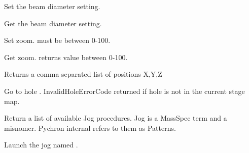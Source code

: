\documentclass[letterpaper,10pt,english]{sphinxmanual}
\begin{document}
\begin{fulllineitems}
Set the beam diameter setting.

\end{fulllineitems}



\begin{fulllineitems}
Get the beam diameter setting.

\end{fulllineitems}



\begin{fulllineitems}
Set zoom.  must be between 0-100.

\end{fulllineitems}



\begin{fulllineitems}
Get zoom. returns value between 0-100.

\end{fulllineitems}



\begin{fulllineitems}
Returns a comma separated list of positions X,Y,Z

\end{fulllineitems}



\begin{fulllineitems}
Go to hole . InvalidHoleErrorCode returned if hole is not in the current stage map.

\end{fulllineitems}



\begin{fulllineitems}
Return a list of available Jog procedures. Jog is a MassSpec term and a misnomer. Pychron internal refers
to them as Patterns.

\end{fulllineitems}



\begin{fulllineitems}
Launch the jog named .

\end{fulllineitems}
\end{document}
